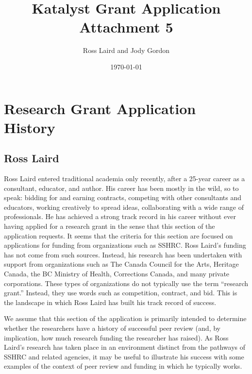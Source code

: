 \documentclass[letterpaper,10pt,headsepline]{scrreprt}
\author{Ross Laird and Jody Gordon}
\title{Katalyst Grant Application Attachment 5}
\date{\today}
\begin{document}
\begin{titlingpage}
\begin{center}
\maketitle
\end{center}
\end{titlingpage}
\setcounter{tocdepth}{3}
\tableofcontents

\section{Research Grant Application History}

\subsection{Ross Laird}


Ross Laird entered traditional academia only recently, after a 25-year career
as a consultant, educator, and author. His career has been mostly in the wild,
so to speak: bidding for and earning contracts, competing with other
consultants and educators, working creatively to spread ideas, collaborating
with a wide range of professionals. He has achieved a strong track record in
his career without ever having applied for a research grant in the sense that
this section of the application requests. It seems that the criteria for this
section are focused on applications for funding from organizations such as
SSHRC. Ross Laird's funding has not come from such sources. Instead, his
research has been undertaken with support from organizations such as The
Canada Council for the Arts, Heritage Canada, the BC Ministry of Health,
Corrections Canada, and many private corporations. These types of
organizations do not typically use the term ``research grant.'' Instead, they
use words such as competition, contract, and bid. This is the landscape in
which Ross Laird has built his track record of success.

We assume that this section of the application is primarily intended to
determine whether the researchers have a history of successful peer review
(and, by implication, how much research funding the researcher has raised). As
Ross Laird's research has taken place in an environment distinct from the
pathways of SSHRC and related agencies, it may be useful to illustrate his
success with some examples of the context of peer review and funding in which
he typically works.
\end{document}
